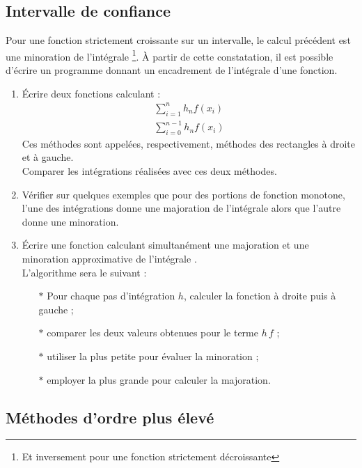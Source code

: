 \subsection{Intervalle de confiance}
Pour une fonction strictement croissante  sur un intervalle, le calcul
précédent  est une  minoration  de l'intégrale \footnote{Et inversement pour  une
fonction strictement décroissante}. À  partir de cette constatation, il
est  possible   d'écrire  un  programme  donnant   un  encadrement  de
l'intégrale d'une fonction.
\begin{enumerate}
\item Écrire deux fonctions calculant :
  \begin{eqnarray*}
    \sum_{i=1}^n h_n f(x_i)\\ \sum_{i=0}^{n-1}h_n f(x_i)
  \end{eqnarray*}
  Ces méthodes sont appelées,  respectivement, méthodes des rectangles
  à droite et  à gauche.  \\ Comparer les  intégrations réalisées avec
  ces deux méthodes.

\item  Vérifier  sur  quelques  exemples  que  pour  des  portions  de
  fonction monotone, l'une des  intégrations donne une majoration de
  l'intégrale alors que l'autre donne une minoration.  %
\item Écrire  une fonction  calculant simultanément une  majoration et
  une       minoration        approximative       de       l'intégrale
  .\\ L'algorithme sera le suivant :
  \begin{itemize}
  \item[$\ast$]  Pour  chaque  pas   d'intégration  $h$,  calculer  la
    fonction à droite puis à gauche ;
  \item[$\ast$] comparer les deux valeurs obtenues pour le terme $h\,f$ ;
  \item[$\ast$] utiliser la plus petite pour évaluer la minoration ;
  \item[$\ast$] employer la plus grande pour calculer la majoration.
\end{itemize}
\end{enumerate}

\subsection{Méthodes d'ordre plus élevé {\sc[Facultatif]}}


